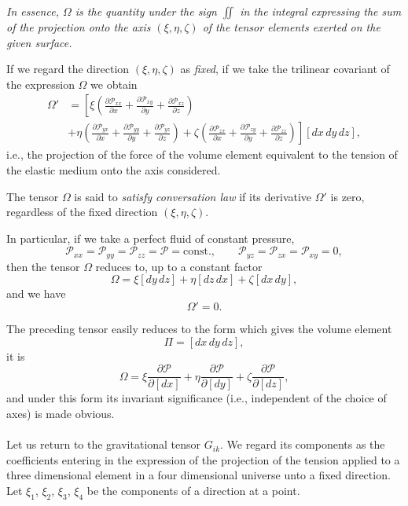 \documentclass[leqno,12pt]{article}
\newcommand{\pd}{\partial}
\theoremstyle{shape1}
\theoremstyle{shape0}
\theoremstyle{shape2}
\theoremstyle{definition}
\begin{document}
\emph{In essence, $\Omega$ is the quantity under the sign $\iint$ in the integral expressing the sum of the projection onto the axis $(\xi,\eta,\zeta)$ of the tensor elements  exerted on the given surface.}

If we regard the direction $(\xi,\eta,\zeta)$ as \emph{fixed}, if we take the trilinear covariant of the expression $\Omega$ we obtain
\begin{align*}
  \Omega'&=\left[\xi\left(\frac{\pd\mathcal{P}_{xx}}{\pd x}+\frac{\pd \mathcal{P}_{xy}}{\pd y}+\frac{\pd \mathcal{P}_{xz}}{\pd z}\right)\right.\\
  &+\left.\eta\left(\frac{\pd \mathcal{P}_{yx}}{\pd x}+\frac{\pd \mathcal{P}_{yy}}{\pd y}+\frac{\pd \mathcal{P}_{yz}}{\pd z}\right)+\zeta\left(\frac{\pd\mathcal{P}_{zx}}{\pd x}+\frac{\pd \mathcal{P}_{zy}}{\pd y}+\frac{\pd \mathcal{P}_{zz}}{\pd z}\right)\right][dx\,dy\,dz],
\end{align*}
i.e., the projection of the force of the volume element equivalent to the tension of the elastic medium onto the axis considered.

The tensor $\Omega$ is said to \emph{satisfy conversation law} if its derivative $\Omega'$ is zero, regardless of the fixed direction $(\xi,\eta,\zeta)$.

In particular, if we take a perfect fluid of constant pressure,
\[
\mathcal{P}_{xx}=\mathcal{P}_{yy}=\mathcal{P}_{zz}=\mathcal{P}=\text{const.},\qquad\mathcal{P}_{yz}=\mathcal{P}_{zx}=\mathcal{P}_{xy}=0,
\]
then the tensor $\Omega$ reduces to, up to a constant factor
\[
\Omega=\xi[dy\,dz]+\eta[dz\,dx]+\zeta[dx\,dy],
\]
and we have
\[
\Omega'=0.
\]

The preceding tensor easily reduces to the form which gives the volume element
\[
\Pi=[dx\,dy\,dz],
\]
it is
\[
\Omega=\xi\frac{\pd\mathcal{P}}{\pd[dx]}+\eta\frac{\pd\mathcal{P}}{\pd[dy]}+\zeta\frac{\pd\mathcal{P}}{\pd[dz]},
\]
and under this form its invariant significance (i.e., independent of the choice of axes) is made obvious.

\paragraph{}
\label{sec:36}
Let us return to the gravitational tensor $G_{ik}$. We regard its components as the coefficients entering in the expression of the projection of the tension applied to a three dimensional element in a four dimensional universe unto a fixed direction. Let $\xi_{1}$, $\xi_{2}$, $\xi_{3}$, $\xi_{4}$ be the components of a direction at a point.
\end{document}
